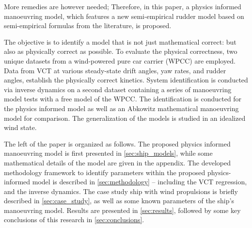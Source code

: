 
More remedies are however needed; Therefore, in this paper, a physics informed manoeuvring model, which features a new semi-empirical rudder model based on semi-empirical formulas from the literature, is proposed.

The objective is to identify a model that is not just mathematical correct: but also as physically correct as possible.
To evaluate the physical correctness, two unique datasets from a wind-powered pure car carrier (WPCC) are employed. Data from VCT at various steady-state drift angles, yaw rates, and rudder angles, establish the physically correct kinetics. System identification is conducted via inverse dynamics \citep{faber_inverse_2018} on a second dataset containing a series of manoeuvring model tests with a free model of the WPCC. The identification is conducted for the physics informed model as well as an Abkowitz mathematical manoeuvring model for comparison. The generalization of the models is studied in an idealized wind state.

The left of the paper is organized as follows. The proposed physics informed manoeuvring model is first presented in \autoref{sec:ship_models}, while some mathematical details of the model are given in the appendix. The developed methodology framework to identify parameters within the proposed physics-informed model is described in \autoref{sec:methodology} -- including the VCT regression, and the inverse dynamics. The case study ship with wind propulsions is briefly described in \autoref{sec:case_study}, as well as some known parameters of the ship's manoeuvring model. Results are presented in \autoref{sec:results}, followed by some key conclusions of this research in \autoref{sec:conclusions}.


